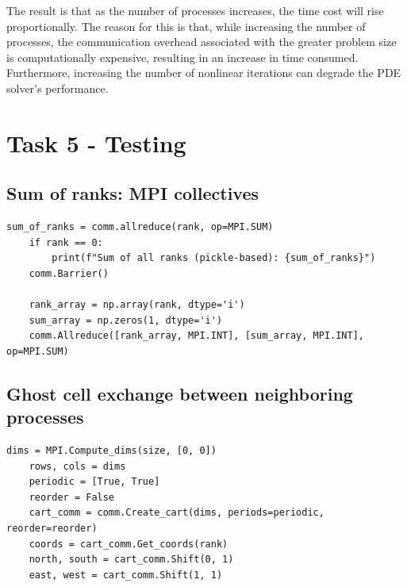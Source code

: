 \documentclass[unicode,11pt,a4paper,oneside,numbers=endperiod,openany]{scrartcl}
\begin{document}
The result is that as the number of processes increases, the time cost will rise proportionally. The reason for this is that, while increasing the number of processes, the communication overhead associated with the greater problem size is computationally expensive, resulting in an increase in time consumed. Furthermore, increasing the number of nonlinear iterations can degrade the PDE solver's performance.

\section{Task 5 - Testing}
\subsection{Sum of ranks: MPI collectives}
\begin{lstlisting}[language=MyPython, style=mystyle, caption={MPI-based Sum of Ranks Calculation in Python}]
    sum_of_ranks = comm.allreduce(rank, op=MPI.SUM)
    if rank == 0:
        print(f"Sum of all ranks (pickle-based): {sum_of_ranks}")
    comm.Barrier()
    
    rank_array = np.array(rank, dtype='i')
    sum_array = np.zeros(1, dtype='i')
    comm.Allreduce([rank_array, MPI.INT], [sum_array, MPI.INT], op=MPI.SUM)
\end{lstlisting}

\subsection{Ghost cell exchange between neighboring processes }
\begin{lstlisting}[language=MyPython, style=mystyle, caption={Creating a 2D Cartesian Topology in MPI}]
    dims = MPI.Compute_dims(size, [0, 0])
    rows, cols = dims
    periodic = [True, True]  
    reorder = False          
    cart_comm = comm.Create_cart(dims, periods=periodic, reorder=reorder)
    coords = cart_comm.Get_coords(rank)
    north, south = cart_comm.Shift(0, 1)
    east, west = cart_comm.Shift(1, 1)
\end{lstlisting}
\end{document}
